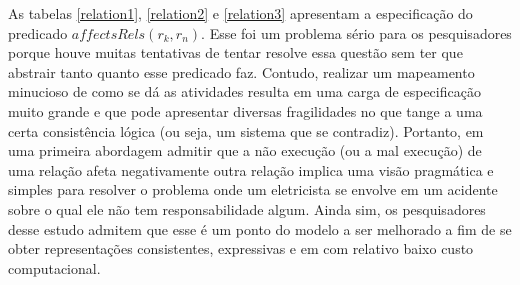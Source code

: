 As tabelas \ref{relation1}, \ref{relation2} e \ref{relation3} apresentam a especificação do predicado $affectsRels(r_k,r_n)$. Esse foi um problema sério para os pesquisadores porque houve muitas tentativas de tentar resolve essa questão sem ter que abstrair tanto quanto esse predicado faz. Contudo, realizar um mapeamento minucioso de como se dá as atividades resulta em uma carga de especificação muito grande e que pode apresentar diversas fragilidades no que tange a uma certa consistência lógica (ou seja, um sistema que se contradiz). Portanto, em uma primeira abordagem admitir que a não execução (ou a mal execução) de uma relação afeta negativamente outra relação implica uma visão pragmática e simples para resolver o problema onde um eletricista se envolve em um acidente sobre o qual ele não tem responsabilidade algum. Ainda sim, os pesquisadores desse estudo admitem que esse é um ponto do modelo a ser melhorado a fim de se obter representações consistentes, expressivas e em com relativo baixo custo computacional. 


